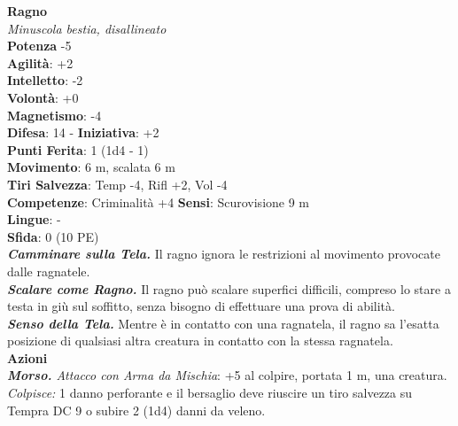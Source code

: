 \begin{multicols}{2}
\medskip\textbf{Ragno}\\
\emph{Minuscola bestia, disallineato}\\
\textbf{Potenza} -5\\
\textbf{Agilità}: +2\\
\textbf{Intelletto}: -2\\
\textbf{Volontà}: +0\\
\textbf{Magnetismo}: -4\\
\textbf{Difesa}: 14 - \textbf{Iniziativa}: +2\\
\textbf{Punti Ferita}: 1 (1d4 - 1)\\
\textbf{Movimento}: 6 m, scalata 6 m\\
\textbf{Tiri Salvezza}: Temp -4, Rifl +2, Vol -4 \\
\textbf{Competenze}: Criminalità +4
\textbf{Sensi}: Scurovisione 9 m\\
\textbf{Lingue}: -\\
\textbf{Sfida}: 0 (10 PE)\smallskip\\

\emph{\textbf{Camminare sulla Tela.}} Il ragno ignora le restrizioni al movimento provocate dalle ragnatele.\\

\emph{\textbf{Scalare come Ragno.}} Il ragno può scalare superfici difficili, compreso lo stare a testa in giù sul soffitto, senza bisogno di effettuare una prova di abilità.\\

\emph{\textbf{Senso della Tela.}} Mentre è in contatto con una ragnatela, il ragno sa l'esatta posizione di qualsiasi altra creatura in contatto con la stessa ragnatela.\\

\smallskip\textbf{Azioni}\\

\emph{\textbf{Morso.} Attacco con Arma da Mischia}: +5 al colpire, portata 1 m, una creatura.\\

\emph{Colpisce:} 1 danno perforante e il bersaglio deve riuscire un tiro salvezza su Tempra DC 9 o subire 2 (1d4) danni da veleno.\\



\end{multicols}
